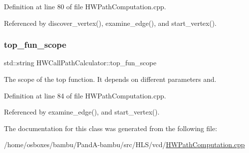 Definition at line 80 of file H\+W\+Path\+Computation.\+cpp.



Referenced by discover\+\_\+vertex(), examine\+\_\+edge(), and start\+\_\+vertex().

\mbox{\label{classHWCallPathCalculator_a903a1ffb11ea45f207eb363e64e73b7a}} 
\subsubsection{\texorpdfstring{top\+\_\+fun\+\_\+scope}{top\_fun\_scope}}
{\footnotesize\ttfamily std\+::string H\+W\+Call\+Path\+Calculator\+::top\+\_\+fun\+\_\+scope\hspace{0.3cm}{\ttfamily [protected]}}



The scope of the top function. It depends on different parameters and. 



Definition at line 84 of file H\+W\+Path\+Computation.\+cpp.



Referenced by examine\+\_\+edge(), and start\+\_\+vertex().



The documentation for this class was generated from the following file\+:\begin{DoxyCompactItemize}
\item 
/home/osboxes/bambu/\+Pand\+A-\/bambu/src/\+H\+L\+S/vcd/\hyperlink{HWPathComputation_8cpp}{H\+W\+Path\+Computation.\+cpp}\end{DoxyCompactItemize}

